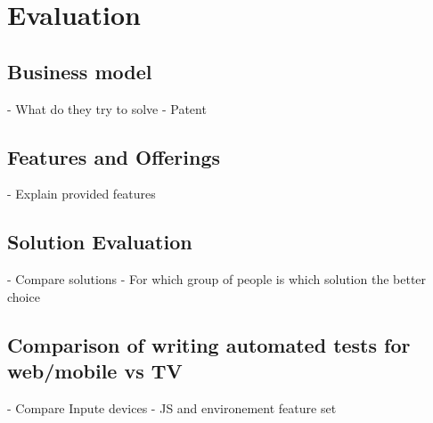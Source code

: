 
\chapter{Evaluation\label{cha:chapter6}}



\section{Business model\label{sec:businessmodel}}

- What do they try to solve
- Patent

\section{Features and Offerings\label{sec:features}}

- Explain provided features

\section{Solution Evaluation\label{sec:usab}}

- Compare solutions
- For which group of people is which solution the better choice

\section{Comparison of writing automated tests for web/mobile vs TV\label{sec:diffInWritingTests}}

- Compare Inpute devices
- JS and environement feature set
